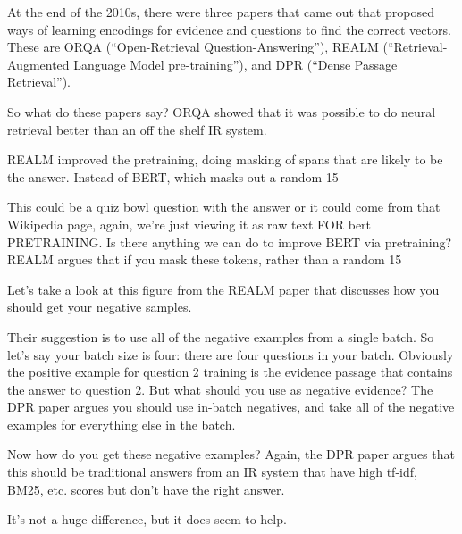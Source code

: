 At the end of the 2010s, there were three papers that came out that proposed ways of learning encodings for evidence and questions to find the correct vectors.  These are ORQA (“Open-Retrieval Question-Answering”), REALM (“Retrieval-Augmented Language Model pre-training”), and DPR (“Dense Passage Retrieval”).

So what do these papers say?  ORQA showed that it was possible to do neural retrieval better than an off the shelf IR system.  

REALM improved the pretraining, doing masking of spans that are likely to be the answer.  Instead of BERT, which masks out a random 15%

This could be a quiz bowl question with the answer or it could come from that Wikipedia page, again, we’re just viewing it as raw text FOR bert PRETRAINING.  Is there anything we can do to improve BERT via pretraining?  REALM argues that if you mask these tokens, rather than a random 15%

Let’s take a look at this figure from the REALM paper that discusses how you should get your negative samples.

Their suggestion is to use all of the negative examples from a single batch.  So let’s say your batch size is four: there are four questions in your batch.  Obviously the positive example for question 2 training is the evidence passage that contains the answer to question 2.  But what should you use as negative evidence?  The DPR paper argues you should use in-batch negatives, and take all of the negative examples for everything else in the batch.

Now how do you get these negative examples?  Again, the DPR paper argues that this should be traditional answers from an IR system that have high tf-idf, BM25, etc. scores but don’t have the right answer.

It’s not a huge difference, but it does seem to help.

